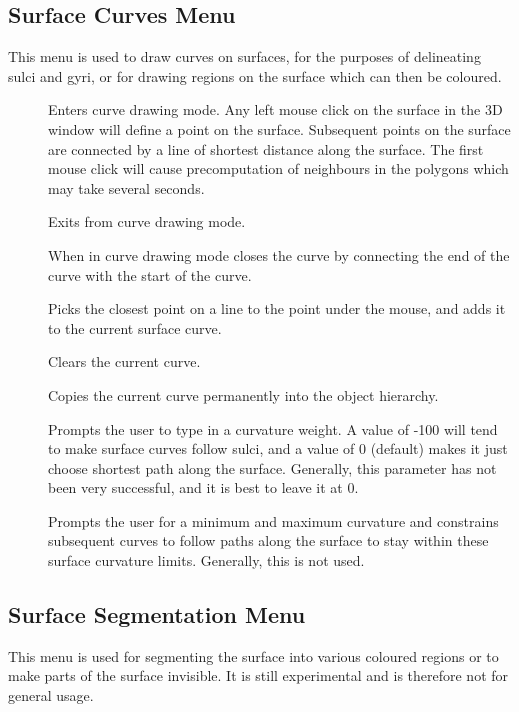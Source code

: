 \subsection{Surface Curves Menu}

This menu is used to draw curves on surfaces, for the purposes of
delineating sulci and gyri, or for drawing regions on the surface which
can then be coloured.

\begin{description}
\item[]  Enters curve drawing
    mode.  Any left mouse click on the surface in the 3D window will
    define a point on the surface.  Subsequent points on the surface are
    connected by a line of shortest distance along the surface.  The
    first mouse click will cause precomputation of neighbours in the polygons
    which may take several seconds.
\item[]  Exits from curve
    drawing mode.
\item[]  When in curve drawing mode
    closes the curve by connecting the end of the curve with the
    start of the curve.
\item[]  Picks the closest point
    on a line to the point under the mouse, and adds it to the current
    surface curve.
\item[]  Clears the current curve.
\item[]  Copies the current curve
    permanently into the object hierarchy.
\item[]  Prompts the user to type
    in a curvature weight.  A value of -100 will tend to make surface
    curves follow sulci, and a value of 0 (default) makes it just choose
    shortest path along the surface.  Generally, this parameter has not
    been very successful, and it is best to leave it at 0.
\item[]  Prompts the user
    for a minimum and maximum curvature and constrains subsequent curves
    to follow paths along the surface to stay within these surface
    curvature limits.  Generally, this is not used.
\end{description}

\subsection{Surface Segmentation Menu}

This menu is used for segmenting the surface into various coloured regions
or to make parts of the surface invisible.  It is still experimental and
is therefore not for general usage.


